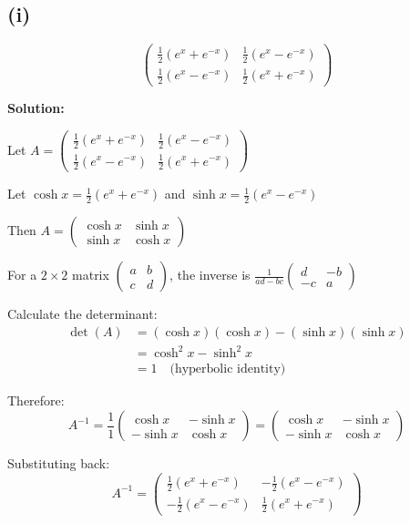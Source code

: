 \subsection*{(i)}
\[
	\begin{pmatrix}
		\frac{1}{2}(e^x + e^{-x}) & \frac{1}{2}(e^x - e^{-x}) \\
		\frac{1}{2}(e^x - e^{-x}) & \frac{1}{2}(e^x + e^{-x})
	\end{pmatrix}
\]

\textbf{Solution:}

Let $A = \begin{pmatrix}
		\frac{1}{2}(e^x + e^{-x}) & \frac{1}{2}(e^x - e^{-x}) \\
		\frac{1}{2}(e^x - e^{-x}) & \frac{1}{2}(e^x + e^{-x})
	\end{pmatrix}$

Let $\cosh x = \frac{1}{2}(e^x + e^{-x})$ and $\sinh x = \frac{1}{2}(e^x - e^{-x})$

Then $A = \begin{pmatrix}
		\cosh x & \sinh x \\
		\sinh x & \cosh x
	\end{pmatrix}$

For a $2 \times 2$ matrix $\begin{pmatrix} a & b \\ c & d \end{pmatrix}$, the inverse is $\frac{1}{ad-bc}\begin{pmatrix} d & -b \\ -c & a \end{pmatrix}$

Calculate the determinant:
\begin{align}
	\det(A) & = (\cosh x)(\cosh x) - (\sinh x)(\sinh x) \\
	        & = \cosh^2 x - \sinh^2 x                   \\
	        & = 1 \quad \text{(hyperbolic identity)}
\end{align}

Therefore:
\[
	A^{-1} = \frac{1}{1}\begin{pmatrix}
		\cosh x  & -\sinh x \\
		-\sinh x & \cosh x
	\end{pmatrix} = \begin{pmatrix}
		\cosh x  & -\sinh x \\
		-\sinh x & \cosh x
	\end{pmatrix}
\]

Substituting back:
\[
	A^{-1} = \begin{pmatrix}
		\frac{1}{2}(e^x + e^{-x})  & -\frac{1}{2}(e^x - e^{-x}) \\
		-\frac{1}{2}(e^x - e^{-x}) & \frac{1}{2}(e^x + e^{-x})
	\end{pmatrix}
\]